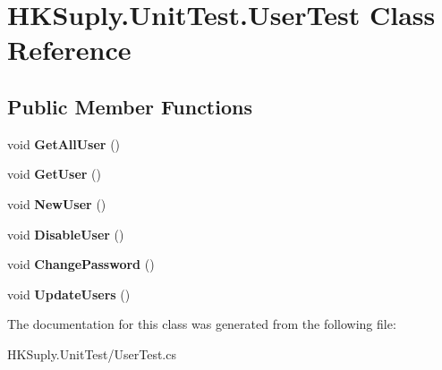 \hypertarget{class_h_k_suply_1_1_unit_test_1_1_user_test}{}\section{H\+K\+Suply.\+Unit\+Test.\+User\+Test Class Reference}
\label{class_h_k_suply_1_1_unit_test_1_1_user_test}
\subsection*{Public Member Functions}
\begin{DoxyCompactItemize}
\item 
\mbox{\label{class_h_k_suply_1_1_unit_test_1_1_user_test_a3b155a2e3f798000decc5cd9bb7ff5bc}} 
void {\bfseries Get\+All\+User} ()
\item 
\mbox{\label{class_h_k_suply_1_1_unit_test_1_1_user_test_a0d33d16a2e9761ccdf686fc6398bd599}} 
void {\bfseries Get\+User} ()
\item 
\mbox{\label{class_h_k_suply_1_1_unit_test_1_1_user_test_a38a60511778b95f7cd2c256697cc4e6f}} 
void {\bfseries New\+User} ()
\item 
\mbox{\label{class_h_k_suply_1_1_unit_test_1_1_user_test_acc37fae05da85affd3a422b32bcd0700}} 
void {\bfseries Disable\+User} ()
\item 
\mbox{\label{class_h_k_suply_1_1_unit_test_1_1_user_test_ac77e49a4ff678e5325e0634aa8425f09}} 
void {\bfseries Change\+Password} ()
\item 
\mbox{\label{class_h_k_suply_1_1_unit_test_1_1_user_test_a8e2c7128da98aa8edb6541a4c037c56d}} 
void {\bfseries Update\+Users} ()
\end{DoxyCompactItemize}


The documentation for this class was generated from the following file\+:\begin{DoxyCompactItemize}
\item 
H\+K\+Suply.\+Unit\+Test/User\+Test.\+cs\end{DoxyCompactItemize}
